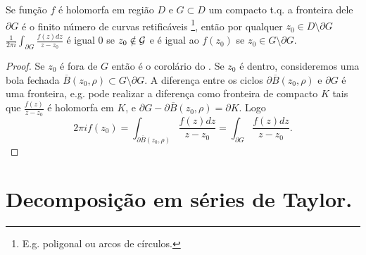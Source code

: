 \begin{teorema}[Cauchy]
Se função $f$ é holomorfa em região $D$ e $G\subset D$ um compacto t.q. a fronteira dele $\partial G$ é o finito número de curvas retificáveis
\footnote{E.g. poligonal ou arcos de círculos.},
então por qualquer $z_0 \in D \setminus \partial G$
$\frac1{2\pi i} \int_{\partial G} \frac{f(z)dz}{z-z_0}$  é igual $0$ se $z_0 \notin \mathcal{G}$ e é igual ao $f(z_0)$ se $z_0 \in G \setminus \partial G$.
\end{teorema}
\begin{proof}
Se $z_0$ é fora de $G$ então é o corolário do .
Se $z_0$ é dentro, consideremos uma bola fechada $\overline{B}(z_0,\rho)\subset G \setminus \partial G$.
A diferença entre os ciclos $\partial \overline{B}(z_0,\rho)$ e $\partial G$ é uma fronteira,
e.g. pode realizar a diferença como fronteira de compacto $K$ tais que $\frac{f(z)}{z-z_0}$ é holomorfa em $K$,
e $\partial G - \partial \overline{B}(z_0,\rho) = \partial K$.
Logo 
\[ 2\pi i f(z_0) = \int_{\partial \overline{B}(z_0,\rho)} \frac{f(z)dz}{z-z_0} = \int_{\partial G} \frac{f(z)dz}{z-z_0}. \]
\end{proof}

\section{Decomposição em séries de Taylor.}

